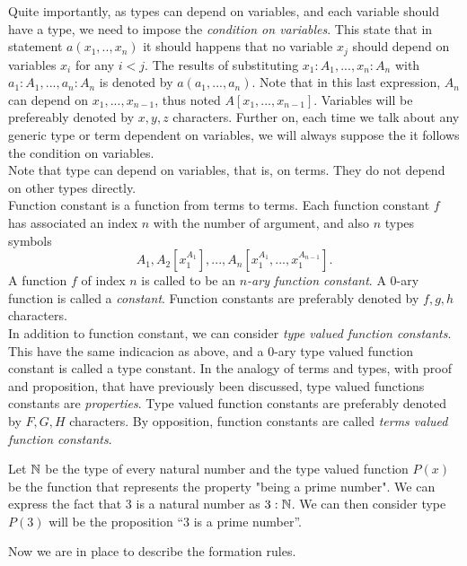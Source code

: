   Quite importantly, as types can depend on variables, and each variable should have a type, we need to impose the \emph{condition on variables}. This state that in statement $a(x_1,..,x_n)$ it should happens that no variable $x_j$ should depend on variables $x_i$ for any $i<j$. The results of substituting $x_1:A_1,...,x_n:A_n$ with $a_1:A_1,...,a_n:A_n$ is denoted by $a(a_1,...,a_n)$. Note that in this last expression, $A_n$ can depend on $x_1,...,x_{n-1}$, thus noted $A[x_1,...,x_{n-1}]$. Variables will be prefereably denoted by $x,y,z$ characters. Further on, each time we talk about any generic type or term dependent on variables, we will always suppose the it follows the condition on variables.\\

Note that type can depend on variables, that is, on terms. They do not depend on other types directly.\\ 
  
Function constant is a function from terms to terms. Each function constant $f$ has associated an index $n$ with the number of argument, and also $n$ types symbols $$A_1, A_2[x_1^{A_1}],...,A_n[x_1^{A_1},...,x_1^{A_{n-1}}].$$ A function $f$ of index $n$ is called to be an \emph{$n$-ary function constant}. A 0-ary function is called a \emph{constant}.  Function constants are preferably denoted by $f,g,h$ characters. \\

In addition to function constant, we can consider \emph{type valued function constants}. This have the same indicacion as above, and a 0-ary type valued function constant is called a type constant. In the analogy of terms and types, with proof and proposition, that have previously been discussed, type valued functions constants are \emph{properties}. Type valued function constants are preferably denoted by $F,G,H$ characters. By opposition, function constants are called \emph{terms valued function constants}.


\begin{example}
Let $\mathbb{N}$ be the type of every natural number and the type valued function $P(x)$ be the function that represents the property "being a prime number". We can express the fact that 3 is a natural number as $3: \mathbb{N}$. We can then consider  type $P(3)$ will be the proposition ``3 is a prime number''. 
\end{example}

Now we are in place to describe the formation rules.

